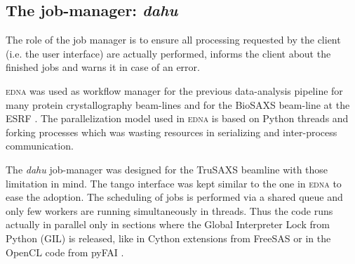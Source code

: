 \documentclass[preprint]{iucr}              %
\begin{document}
\subsection{The job-manager: \textit{dahu}}

The role of the job manager is to ensure all processing requested by the client (i.e. the user interface) are actually performed, informs the client about the finished jobs and warns it in case of an error.

\textsc{edna} was used as workflow manager for the previous data-analysis pipeline for many protein crystallography beam-lines \cite{edna} and for the BioSAXS beam-line at the ESRF \cite{BM29ODA}.
The parallelization model used in \textsc{edna} is based on Python threads and forking processes which was wasting resources in serializing and inter-process communication. 
 
The \textit{dahu} job-manager was designed for the TruSAXS beamline \cite{id02_2022} with those limitation in mind. 
The tango interface \cite{tango} was kept similar to the one in \textsc{edna} to ease the adoption.
The scheduling of jobs is performed via a shared queue and only few workers are running simultaneously in threads.
Thus the code runs actually in parallel only in sections where the Global Interpreter Lock from Python (GIL) is released, like in Cython extensions \cite{cython} from FreeSAS or in the OpenCL code from pyFAI \cite{pyFAI_gpu}.
\end{document}
